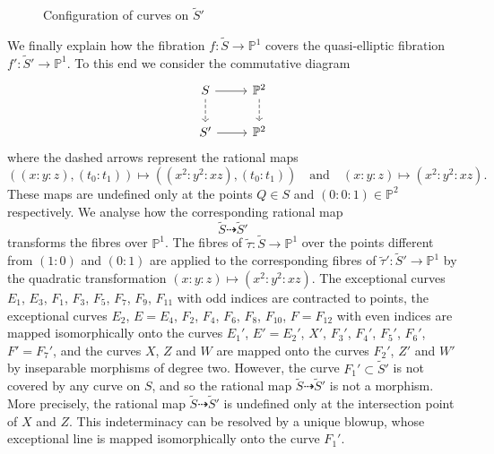 \documentclass[12pt,reqno]{amsart}
\theoremstyle{definition}
\newcommand{\ttto}{\dashrightarrow} %
\newcommand{\wt}{\widetilde}
\newcommand{\PP}{\mathbb{P}}
\begin{document}
\begin{figure}[h]
\caption{Configuration of curves on $\wt S'$}\label{2024_07_23_20:20}
\end{figure}

We finally explain how the fibration $f:\wt S\to \PP^1$ covers the quasi-elliptic fibration $f':\wt S'\to \PP^1$. To this end we consider the commutative diagram
\[
\begin{tikzcd}
    S \ar[d,dashed] \ar[r] & \PP^2 \ar[d,dashed] \\
    S' \ar[r] & \PP^2 
\end{tikzcd}
\]
where the dashed arrows represent the rational maps
\[ ((x:y:z),(t_0:t_1)) \mapsto ((x^2:y^2:xz),(t_0:t_1)) \quad \text{and} \quad (x:y:z)\mapsto (x^2 : y^2 : xz). \]
These maps are undefined only at the points $Q\in S$ and $(0:0:1)\in \PP^2$ respectively.
We analyse how the corresponding rational map
\[ \wt S \ttto \wt S' \]
transforms the fibres over $\PP^1$.
The fibres of $\wt \tau: \wt S \to \PP^1$ over the points different from $(1:0)$ and $(0:1)$ are applied to the corresponding fibres of $\wt \tau' : \wt S' \to \PP^1$ by the quadratic transformation $(x:y:z)\mapsto (x^2 : y^2 : xz)$.
The exceptional curves $E_1$, $E_3$, $F_1$, $F_3$, $F_5$, $F_7$, $F_9$, $F_{11}$ with odd indices are contracted to points,
the exceptional curves $E_2$, $E=E_4$, $F_2$, $F_4$, $F_6$, $F_8$, $F_{10}$, $F=F_{12}$ with even indices are mapped isomorphically onto the curves $E_1'$, $E'=E_2'$, $X'$, $F_3'$, $F_4'$, $F_5'$, $F_6'$, $F'=F_7'$, 
and the curves $X$, $Z$ and $W$ are mapped onto the curves $F_2'$, $Z'$ and $W'$ by inseparable morphisms of degree two.
However, the curve $F_1' \subset \wt S'$ is not covered by any curve on $S$, and so the rational map $\wt S \ttto \wt S'$ is not a morphism.
More precisely, the rational map $\wt S \ttto \wt S'$ is undefined only at the intersection point of $X$ and $Z$. This indeterminacy can be resolved by a unique blowup, whose exceptional line is mapped isomorphically onto the curve $F_1'$.
\end{document}
